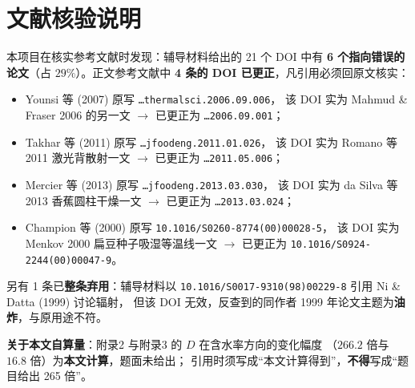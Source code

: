 \section{文献核验说明}
\setcounter{table}{0}
\label{sec:refnote}

本项目在核实参考文献时发现：辅导材料给出的 21 个 DOI 中有
\textbf{6 个指向错误的论文}（占 $29\%$）。正文参考文献中
\textbf{4 条的 DOI 已更正}，凡引用必须回原文核实：

\begin{itemize}[leftmargin=1.4em, itemsep=1pt]
  \item Younsi 等 (2007) 原写 \texttt{\ldots thermalsci.2006.09.006}，
        该 DOI 实为 Mahmud \& Fraser 2006 的另一文 $\to$ 已更正为
        \texttt{\ldots 2006.09.001}；
  \item Takhar 等 (2011) 原写 \texttt{\ldots jfoodeng.2011.01.026}，
        该 DOI 实为 Romano 等 2011 激光背散射一文 $\to$ 已更正为
        \texttt{\ldots 2011.05.006}；
  \item Mercier 等 (2013) 原写 \texttt{\ldots jfoodeng.2013.03.030}，
        该 DOI 实为 da Silva 等 2013 香蕉圆柱干燥一文 $\to$ 已更正为
        \texttt{\ldots 2013.03.024}；
  \item Champion 等 (2000) 原写 \texttt{10.1016/S0260-8774(00)00028-5}，
        该 DOI 实为 Menkov 2000 扁豆种子吸湿等温线一文 $\to$ 已更正为
        \texttt{10.1016/S0924-2244(00)00047-9}。
\end{itemize}

另有 1 条已\textbf{整条弃用}：辅导材料以
\texttt{10.1016/S0017-9310(98)00229-8} 引用 Ni \& Datta (1999) 讨论辐射，
但该 DOI 无效，反查到的同作者 1999 年论文主题为\textbf{油炸}，与原用途不符。

\textbf{关于本文自算量}：附录2 与附录3 的 $D$ 在含水率方向的变化幅度
（$266.2$ 倍与 $16.8$ 倍）为\textbf{本文计算}，题面未给出；
引用时须写成``本文计算得到''，\textbf{不得}写成``题目给出 265 倍''。
